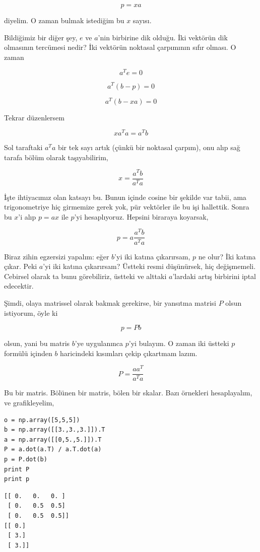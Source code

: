 \documentclass[12pt,fleqn]{article}\usepackage{../../common}
\begin{document}
$$ p = xa $$

diyelim. O zaman bulmak istediğim bu $x$ sayısı. 

Bildiğimiz bir diğer şey, $e$ ve $a$'nin birbirine dik olduğu. İki vektörün
dik olmasının tercümesi nedir? İki vektörün noktasal çarpımının sıfır
olması. O zaman

$$ a^T e = 0 $$

$$ a^T(b - p) = 0 $$

$$ a^T(b - xa) = 0 $$

Tekrar düzenlersem

$$ xa^Ta = a^Tb $$

Sol taraftaki $a^Ta$ bir tek sayı artık (çünkü bir noktasal çarpım), onu
alıp sağ tarafa bölüm olarak taşıyabilirim,

$$ x = \frac{ a^Tb}{a^Ta} $$

İşte ihtiyacımız olan katsayı bu. Bunun içinde cosine bir şekilde var
tabii, ama trigonometriye hiç girmemize gerek yok, pür vektörler ile bu işi
hallettik. Sonra bu $x$'i alıp $p = ax$ ile $p$'yi hesaplıyoruz. Hepsini
biraraya koyarsak, 

$$ p = a\frac{ a^Tb}{a^Ta} $$

Biraz zihin egzersizi yapalım: eğer $b$'yi iki katına çıkarırsam, $p$ ne
olur? İki katına çıkar. Peki $a$'yi  iki katına çıkarırsam? Üstteki resmi
düşünürsek, hiç değişmemeli. Cebirsel olarak ta bunu görebiliriz, üstteki
ve alttaki $a$'lardaki artış birbirini iptal edecektir. 

Şimdi, olaya matrissel olarak bakmak gerekirse, bir yansıtma matrisi $P$
olsun istiyorum, öyle ki 

$$ p = P b $$

olsun, yani bu matris $b$'ye uygulanınca $p$'yi bulayım. O zaman iki üstteki $p$
formülü içinden $b$ haricindeki kısımları çekip çıkartmam lazım.

$$ P  = \frac{ aa^T}{a^Ta} $$

Bu bir matris. Bölünen bir matris, bölen bir skalar. Bazı örnekleri
hesaplayalım, ve grafikleyelim,

\begin{verbatim}
o = np.array([5,5,5])
b = np.array([[3.,3.,3.]]).T
a = np.array([[0,5.,5.]]).T
P = a.dot(a.T) / a.T.dot(a)
p = P.dot(b)
print P
print p
\end{verbatim}

\begin{verbatim}
[[ 0.   0.   0. ]
 [ 0.   0.5  0.5]
 [ 0.   0.5  0.5]]
[[ 0.]
 [ 3.]
 [ 3.]]
\end{verbatim}
\end{document}
